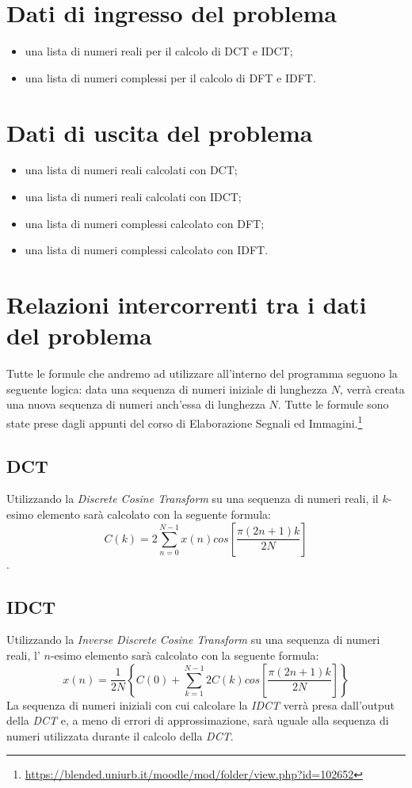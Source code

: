 \documentclass{report}
\begin{document}
	
	\section{Dati di ingresso del problema}
	
	\begin{itemize}
		\item una lista di numeri reali per il calcolo di DCT e IDCT;
		\item una lista di numeri complessi per il calcolo di DFT e IDFT.
	\end{itemize}
	\section{Dati di uscita del problema}
	\begin{itemize}
		\item una lista di numeri reali calcolati con DCT;
		\item una lista di numeri reali calcolati con IDCT;
		\item una lista di numeri complessi calcolato con DFT;
		\item una lista di numeri complessi calcolato con IDFT.
	\end{itemize}
	\section{Relazioni intercorrenti tra i dati del problema}
  Tutte le formule che andremo ad utilizzare all'interno del programma seguono la seguente logica:
  data una sequenza di numeri iniziale di lunghezza $N$, verrà creata una nuova sequenza di numeri anch'essa di lunghezza $N$.
  Tutte le formule sono state prese dagli appunti del corso di Elaborazione Segnali ed Immagini.\footnote{\url{https://blended.uniurb.it/moodle/mod/folder/view.php?id=102652}}
  \subsection{DCT}
  Utilizzando la \textit{Discrete Cosine Transform} su una sequenza di numeri reali, il $k$-esimo elemento sarà calcolato con la seguente formula:
  \[C(k) = 2 \sum_{n = 0}^{N -1} x(n) cos\left[\frac{\pi(2n + 1)k}{2N}\right]\].
  
  \subsection{IDCT}
  Utilizzando la \textit{Inverse Discrete Cosine Transform} su una sequenza di numeri reali, l' $n$-esimo elemento sarà calcolato con la seguente formula:
  \[x(n) = \frac{1}{2N}\left\{C(0) + \sum_{k = 1}^{N -1} 2C(k) cos\left[\frac{\pi(2n + 1)k}{2N}\right]\right\}\]
  \noindent La sequenza di numeri iniziali con cui calcolare la \textit{IDCT} verrà presa dall'output della \textit{DCT} e, a meno di errori di approssimazione, sarà uguale alla sequenza di numeri utilizzata durante il calcolo della \textit{DCT}.
\end{document}
